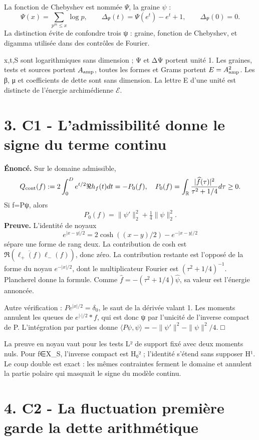 \documentclass[
  10pt,
  a4paper,
]{article}
\begin{document}
La fonction de Chebyshev est nommée \(\Psi\), la graine \(\psi\) : \[
\Psi(x)=\sum_{p^m\le x}\log p,\qquad
\Delta_\Psi(t)=\Psi(e^t)-e^t+1,\qquad \Delta_\Psi(0)=0.
\] La distinction évite de confondre trois ψ : graine, fonction de
Chebyshev, et digamma utilisée dans des contrôles de Fourier.

x,t,S sont logarithmiques sans dimension ; Ψ et ΔΨ portent unité 1. Les
graines, tests et sources portent \(A_{\rm amp}\), toutes les formes et
Grams portent \(E=A_{\rm amp}^2\). Les β, μ et coefficients de dette
sont sans dimension. La lettre E d'une unité est distincte de l'énergie
archimédienne \(\mathcal E\).

\hypertarget{c1---ladmissibilituxe9-donne-le-signe-du-terme-continu}{%
\section{3. C1 - L'admissibilité donne le signe du terme
continu}\label{c1---ladmissibilituxe9-donne-le-signe-du-terme-continu}}

\textbf{Énoncé.} Sur le domaine admissible, \[
Q_{\rm cont}(f):=2\int_0^D e^{t/2}\Re h_f(t)dt=-P_0(f),
\quad P_0(f)=\int_{\mathbb R}\frac{|\widehat f(\tau)|^2}{\tau^2+1/4}d\tau\ge0.
\] Si f=Pψ, alors \[
\boxed{P_0(f)=\|\psi'\|_2^2+\tfrac14\|\psi\|_2^2.}
\] \textbf{Preuve.} L'identité de noyaux \[
e^{|x-y|/2}=2\cosh((x-y)/2)-e^{-|x-y|/2}
\] sépare une forme de rang deux. La contribution de cosh est
\(\Re(\overline{\ell_+(f)}\ell_-(f))\), donc zéro. La contribution
restante est l'opposé de la forme du noyau \(e^{-|x|/2}\), dont le
multiplicateur Fourier est \((\tau^2+1/4)^{-1}\). Plancherel donne la
formule. Comme \(\widehat f=-(\tau^2+1/4)\widehat\psi\), sa valeur est
l'énergie annoncée.

Autre vérification : \(P e^{|x|/2}=\delta_0\), le saut de la dérivée
valant 1. Les moments annulent les queues de \(e^{|\cdot|/2}*f\), qui
est donc ψ par l'unicité de l'inverse compact de P. L'intégration par
parties donne \(\langle P\psi,\psi\rangle=-\|\psi'\|^2-\|\psi\|^2/4\). □

La preuve en noyau vaut pour les tests L² de support fixé avec deux
moments nuls. Pour f∈X\_S, l'inverse compact est H₀² ; l'identité
s'étend sans supposer H¹. Le coup double est exact : les mêmes
contraintes ferment le domaine et annulent la partie polaire qui
masquait le signe du modèle continu.

\hypertarget{c2---la-fluctuation-premiuxe8re-garde-la-dette-arithmuxe9tique}{%
\section{4. C2 - La fluctuation première garde la dette
arithmétique}\label{c2---la-fluctuation-premiuxe8re-garde-la-dette-arithmuxe9tique}}
\end{document}
